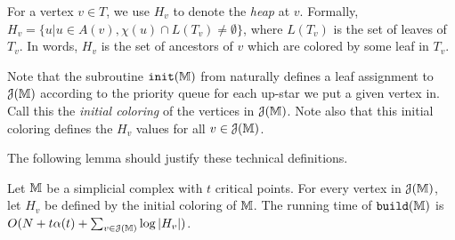 {For a vertex $v\in T$, we use $H_v$ to denote the \emph{heap} at $v$.
Formally, $H_v = \{u | u \in A(v), \chi(u) \cap L(T_v) \neq \emptyset\}$, where $L(T_v)$ is the set of leaves of $T_v$.
In words, $H_v$ is the set of ancestors of $v$ which are colored by some leaf in $T_v$.


\begin{definition}
\label{def:initialColoring}
Note that the subroutine ${\tt init}(\mathbb{M})$ from  naturally defines a leaf assignment to ${\cal J}(\mathbb{M})$ 
according to the priority queue for each up-star we put a given vertex in.  Call this the \emph{initial coloring}
of the vertices in ${\cal J}(\mathbb{M})$.  Note also that this initial coloring defines the $H_v$ values for all $v\in {\cal J}(\mathbb{M})$.
\end{definition}

The following lemma should justify these technical definitions.

\begin{lemma}
\label{lem:runTimeUpper}
Let $\mathbb{M}$ be a simplicial complex with $t$ critical points.  For every vertex in ${\cal J}(\mathbb{M})$, 
let $H_v$ be defined by the initial coloring of $\mathbb{M}$.
The running time of ${\tt build}(\mathbb{M})$ is $O(N+t\alpha(t) + \sum_{v \in {\cal J}(\mathbb{M})} \log |H_v|)$.
\end{lemma}
}
